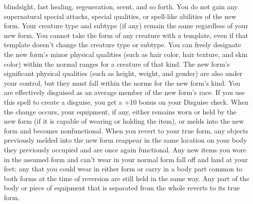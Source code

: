 blindsight, fast healing, regeneration, scent, and so forth.
You do not gain any supernatural special attacks, special qualities, or spell-like
abilities of the new form. Your creature type and subtype (if any) remain the same
regardless of your new form. You cannot take the form of any creature with a template,
even if that template doesn't change the creature type or subtype.
You can freely designate the new form's minor physical qualities (such as hair
color, hair texture, and skin color) within the normal ranges for a creature of
that kind. The new form's significant physical qualities (such as height, weight,
and gender) are also under your control, but they must fall within the norms for
the new form's kind. You are effectively disguised as an average member of the
new form's race. If you use this spell to create a disguise, you get a +10 bonus
on your Disguise check.
When the change occurs, your equipment, if any, either remains worn or held by
the new form (if it is capable of wearing or holding the item), or melds into the
new form and becomes nonfunctional. When you revert to your true form, any objects
previously melded into the new form reappear in the same location on your body
they previously occupied and are once again functional. Any new items you wore
in the assumed form and can't wear in your normal form fall off and land at your
feet; any that you could wear in either form or carry in a body part common to
both forms at the time of reversion are still held in the same way. Any part of
the body or piece of equipment that is separated from the whole reverts to its
true form.